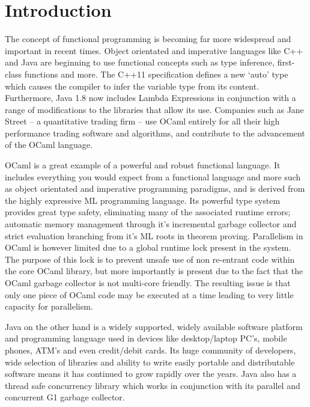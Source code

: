 \documentclass[a4paper]{article}
\begin{document}


\section{Introduction}
\label{sec:introduction}
The concept of functional programming is becoming far more widespread and important in recent times. Object orientated and imperative languages like C++ and Java are beginning to use functional concepts such as type inference, first-class functions and more. The C++11 specification defines a new `auto' type which causes the compiler to infer the variable type from its content\cite{web:autokeyword}. Furthermore, Java 1.8 now includes Lambda Expressions in conjunction with a range of modifications to the libraries that allow its use\cite{web:javalambda}. Companies such as Jane Street -- a quantitative trading firm -- use OCaml entirely for all their high performance trading software and algorithms\cite{web:janestreettech}, and contribute to the advancement of the OCaml language.

OCaml is a great example of a powerful and robust functional language. It includes everything you would expect from a functional language and more such as object orientated and imperative programming paradigms, and is derived from the highly expressive ML programming language. Its powerful type system provides great type safety, eliminating many of the associated runtime errors; automatic memory management through it's incremental garbage collector and strict evaluation branching from it's ML roots in theorem proving. Parallelism in OCaml is however limited due to a global runtime lock present in the system. The purpose of this lock is to prevent unsafe use of non re-entrant code within the core OCaml library, but more importantly is present due to the fact that the OCaml garbage collector is not multi-core friendly\cite{clerc2012}. The resulting issue is that only one piece of OCaml code may be executed at a time leading to very little capacity for parallelism.

Java on the other hand is a widely supported, widely available software platform and programming language used in devices like desktop/laptop PC's, mobile phones, ATM's and even credit/debit cards\cite{web:aboutjava}. Its huge community of developers, wide selection of libraries and ability to write easily portable and distributable software means it has continued to grow rapidly over the years. Java also has a thread safe concurrency library which works in conjunction with its parallel and concurrent G1 garbage collector.
\end{document}
